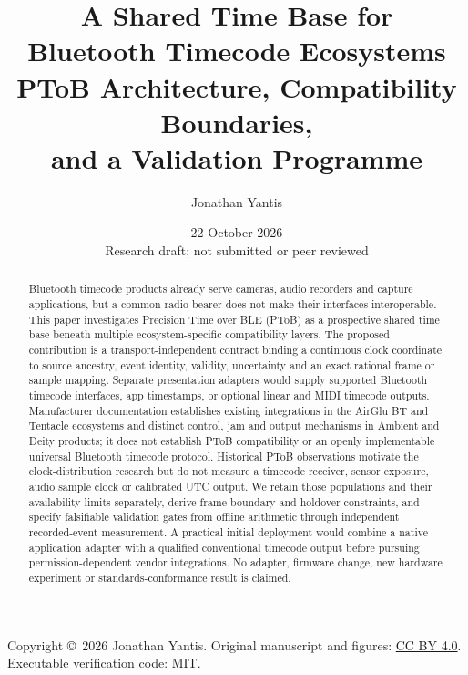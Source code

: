 \documentclass[11pt,letterpaper]{article}
\begin{document}
\title{\vspace{-1.2em}A Shared Time Base for\\Bluetooth Timecode Ecosystems\\[5pt]\large PToB Architecture, Compatibility Boundaries,\\and a Validation Programme}
\author{Jonathan Yantis}
\date{22 October 2026\\\small Research draft; not submitted or peer reviewed}
\maketitle
\begin{abstract}
Bluetooth timecode products already serve cameras, audio recorders and capture applications, but a common radio bearer does not make their interfaces interoperable. This paper investigates Precision Time over BLE (PToB) as a prospective shared time base beneath multiple ecosystem-specific compatibility layers. The proposed contribution is a transport-independent contract binding a continuous clock coordinate to source ancestry, event identity, validity, uncertainty and an exact rational frame or sample mapping. Separate presentation adapters would supply supported Bluetooth timecode interfaces, app timestamps, or optional linear and MIDI timecode outputs. Manufacturer documentation establishes existing integrations in the AirGlu BT and Tentacle ecosystems and distinct control, jam and output mechanisms in Ambient and Deity products; it does not establish PToB compatibility or an openly implementable universal Bluetooth timecode protocol. Historical PToB observations motivate the clock-distribution research but do not measure a timecode receiver, sensor exposure, audio sample clock or calibrated UTC output. We retain those populations and their availability limits separately, derive frame-boundary and holdover constraints, and specify falsifiable validation gates from offline arithmetic through independent recorded-event measurement. A practical initial deployment would combine a native application adapter with a qualified conventional timecode output before pursuing permission-dependent vendor integrations. No adapter, firmware change, new hardware experiment or standards-conformance result is claimed.
\end{abstract}
\noindent\small Copyright \copyright\ 2026 Jonathan Yantis. Original manuscript and figures: \href{https://creativecommons.org/licenses/by/4.0/}{CC BY 4.0}. Executable verification code: MIT.\normalsize
\end{document}
